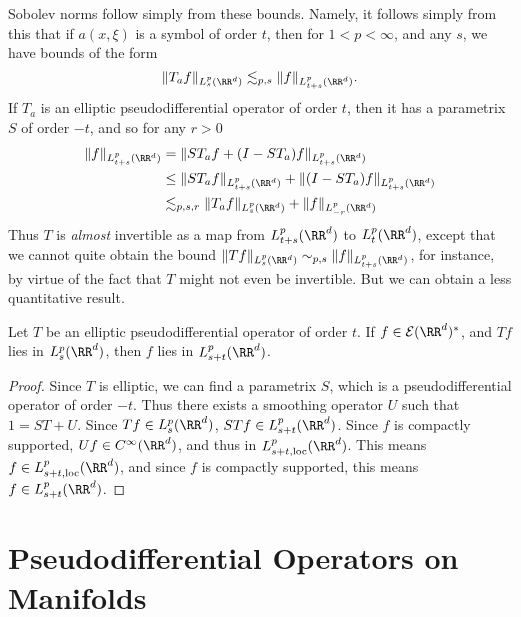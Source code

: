 Sobolev norms follow simply from these bounds. Namely, it follows simply from this that if $a(x,\xi)$ is a symbol of order $t$, then for $1 < p < \infty$, and any $s$, we have bounds of the form
%
\[ \| T_a f \|_{L^p_s(\RR^d)} \lesssim_{p,s} \| f \|_{L^p_{t + s}(\RR^d)}. \]
%
If $T_a$ is an elliptic pseudodifferential operator of order $t$, then it has a parametrix $S$ of order $-t$, and so for any $r > 0$
%
\begin{align*}
    \| f \|_{L^p_{t + s}(\RR^d)} &= \| ST_a f + (I - ST_a) f \|_{L^p_{t+s}(\RR^d)}\\
    &\leq \| ST_a f \|_{L^p_{t+s}(\RR^d)} + \| (I - ST_a) f \|_{L^p_{t+s}(\RR^d)}\\
    &\lesssim_{p,s,r} \| T_a f \|_{L^p_s(\RR^d)} + \| f \|_{L^p_{-r}(\RR^d)} 
\end{align*}
%
Thus $T$ is \emph{almost} invertible as a map from $L^p_{t+s}(\RR^d)$ to $L^p_t(\RR^d)$, except that we cannot quite obtain the bound $\| T f \|_{L^p_s(\RR^d)} \sim_{p,s} \| f \|_{L^p_{t + s}(\RR^d)}$, for instance, by virtue of the fact that $T$ might not even be invertible. But we can obtain a less quantitative result.

\begin{theorem}
    Let $T$ be an elliptic pseudodifferential operator of order $t$. If $f \in \mathcal{E}(\RR^d)^*$, and $Tf$ lies in $L^p_s(\RR^d)$, then $f$ lies in $L^p_{s + t}(\RR^d)$.
\end{theorem}
\begin{proof}
    Since $T$ is elliptic, we can find a parametrix $S$, which is a pseudodifferential operator of order $-t$. Thus there exists a smoothing operator $U$ such that $1 = ST + U$. Since $Tf \in L^p_s(\RR^d)$, $STf \in L^p_{s + t}(\RR^d)$. Since $f$ is compactly supported, $Uf \in C^\infty(\RR^d)$, and thus in $L^p_{s+t,\text{loc}}(\RR^d)$. This means $f \in L^p_{s+t,\text{loc}}(\RR^d)$, and since $f$ is compactly supported, this means $f \in L^p_{s+t}(\RR^d)$.
\end{proof}















\section{Pseudodifferential Operators on Manifolds}

